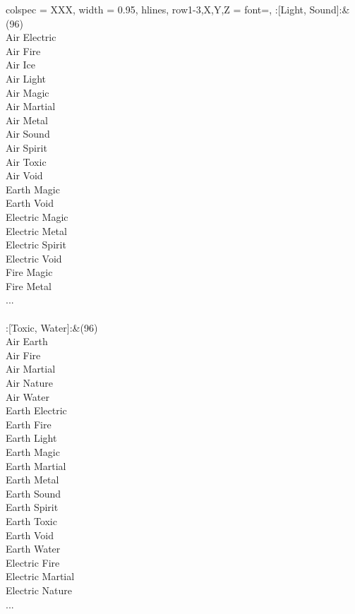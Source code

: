 \begin{longtblr}[
	caption = {2v2 Defending Weak},
	label = {2v2-Defending-Weak},
]{
	colspec = {XXX}, width = 0.95\linewidth,
	hlines,
	row{1-3,X,Y,Z} = {font=\bfseries},
}
	:[Light, Sound]:&{(96)\\
	Air Electric \\
	Air Fire \\
	Air Ice \\
	Air Light \\
	Air Magic \\
	Air Martial \\
	Air Metal \\
	Air Sound \\
	Air Spirit \\
	Air Toxic \\
	Air Void \\
	Earth Magic \\
	Earth Void \\
	Electric Magic \\
	Electric Metal \\
	Electric Spirit \\
	Electric Void \\
	Fire Magic \\
	Fire Metal \\
	...\\
	}\\

	:[Toxic, Water]:&{(96)\\
	Air Earth \\
	Air Fire \\
	Air Martial \\
	Air Nature \\
	Air Water \\
	Earth Electric \\
	Earth Fire \\
	Earth Light \\
	Earth Magic \\
	Earth Martial \\
	Earth Metal \\
	Earth Sound \\
	Earth Spirit \\
	Earth Toxic \\
	Earth Void \\
	Earth Water \\
	Electric Fire \\
	Electric Martial \\
	Electric Nature \\
	...\\
	}\\


\end{longtblr}

